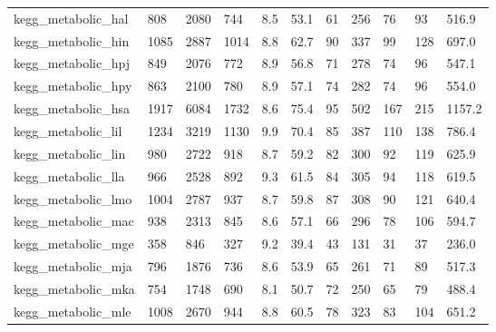 \begin{longtable}{lllllllllll}
 kegg\_metabolic\_hal                                 & 808        & 2080      & 744   & 8.5    & 53.1   & 61    & 256    & 76     & 93     & 516.9   \\
 kegg\_metabolic\_hin                                 & 1085       & 2887      & 1014  & 8.8    & 62.7   & 90    & 337    & 99     & 128    & 697.0   \\
 kegg\_metabolic\_hpj                                 & 849        & 2076      & 772   & 8.9    & 56.8   & 71    & 278    & 74     & 96     & 547.1   \\
 kegg\_metabolic\_hpy                                 & 863        & 2100      & 780   & 8.9    & 57.1   & 74    & 282    & 74     & 96     & 554.0   \\
 kegg\_metabolic\_hsa                                 & 1917       & 6084      & 1732  & 8.6    & 75.4   & 95    & 502    & 167    & 215    & 1157.2  \\
 kegg\_metabolic\_lil                                 & 1234       & 3219      & 1130  & 9.9    & 70.4   & 85    & 387    & 110    & 138    & 786.4   \\
 kegg\_metabolic\_lin                                 & 980        & 2722      & 918   & 8.7    & 59.2   & 82    & 300    & 92     & 119    & 625.9   \\
 kegg\_metabolic\_lla                                 & 966        & 2528      & 892   & 9.3    & 61.5   & 84    & 305    & 94     & 118    & 619.5   \\
 kegg\_metabolic\_lmo                                 & 1004       & 2787      & 937   & 8.7    & 59.8   & 87    & 308    & 90     & 121    & 640.4   \\
 kegg\_metabolic\_mac                                 & 938        & 2313      & 845   & 8.6    & 57.1   & 66    & 296    & 78     & 106    & 594.7   \\
 kegg\_metabolic\_mge                                 & 358        & 846       & 327   & 9.2    & 39.4   & 43    & 131    & 31     & 37     & 236.0   \\
 kegg\_metabolic\_mja                                 & 796        & 1876      & 736   & 8.6    & 53.9   & 65    & 261    & 71     & 89     & 517.3   \\
 kegg\_metabolic\_mka                                 & 754        & 1748      & 690   & 8.1    & 50.7   & 72    & 250    & 65     & 79     & 488.4   \\
 kegg\_metabolic\_mle                                 & 1008       & 2670      & 944   & 8.8    & 60.5   & 78    & 323    & 83     & 104    & 651.2   \\

\end{longtable}
